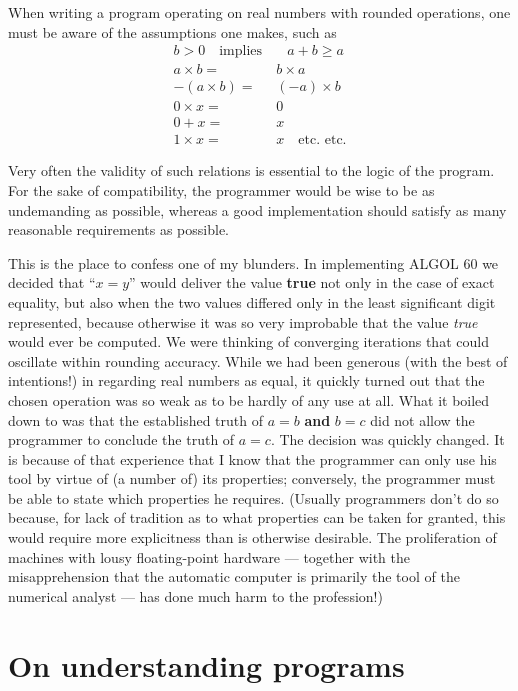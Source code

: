 When writing a program operating on real numbers with rounded operations, one must be aware of the assumptions one makes, such as
\begin{equation*}
	\begin{split}
		b > 0\quad \text{implies}&\quad a + b \geqslant a\\
		a\times b =&\ b\times a\\
		-(a \times  b) =&\ (-a)\times b\\
		0\times  x =&\ 0\\
		0 + x =&\ x\\
		1\times x =&\ x\quad\text{etc. etc.}
	\end{split}
\end{equation*}

Very often the validity of such relations is essential to the logic of the program. For the sake of compatibility, the programmer would be wise to be as undemanding as possible, whereas a good implementation should satisfy as many reasonable requirements as possible.

This is the place to confess one of my blunders. In implementing ALGOL 60 we decided that ``$x = y$'' would deliver the value \textbf{true} not only in the case of exact equality, but also when the two values differed only in the least significant digit represented, because otherwise it was so very improbable that the value \textit{true} would ever be computed. We were thinking of converging iterations that could oscillate within rounding accuracy. While we had been generous (with the best of intentions!) in regarding real numbers as equal, it quickly turned out that the chosen operation was so weak as to be hardly of any use at all. What it boiled down to was that the established truth of $a = b$ \textbf{and} $b = c$ did not allow the programmer to conclude the truth of $a = c$. The decision was quickly changed. It is because of that experience that I know that the programmer can only use his tool by virtue of (a number of) its properties; conversely, the programmer must be able to state which properties he requires. (Usually programmers don't do so because, for lack of tradition as to what properties can be taken for granted, this would require more explicitness than is otherwise desirable. The proliferation of machines with lousy floating-point hardware --- together with the misapprehension that the automatic computer is primarily the tool of the numerical analyst --- has done much harm to the profession!)

\section{On understanding programs}
\label{sec:undertanding-programs}

